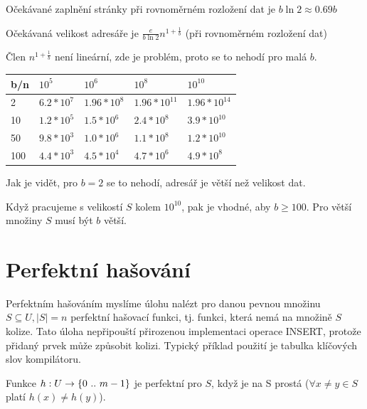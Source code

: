 Očekávané zaplnění stránky při rovnoměrném rozložení dat je 
$b \ln 2 \approx 0.69 b$

Očekávaná velikost adresáře je $\frac{e}{b \ln 2} n^{1 + \frac{1}{b}}$ (při
rovnoměrném rozložení dat)

\begin{pozn}
Člen $n^{1 + \frac{1}{b}}$ není lineární, zde je problém, proto se to
nehodí pro malá $b$.
\end{pozn}

\begin{tabular}{|l||l|l|l|l|}
\hline
b/n   	&$10^5$   &$10^6$ 	&$10^8$ 	&$10^{10}$    \\
\hline
2  	&$6.2*10^7$  &$1.96*10^8$	&$1.96*10^{11}$	&$1.96*10^{14}$ \\
10	&$1.2*10^5$  &$1.5*10^6$	&$2.4*10^8$	&$3.9*10^{10}$  \\
50	&$9.8*10^3$  &$1.0*10^6$	&$1.1*10^8$	&$1.2*10^{10}$  \\
100	&$4.4*10^3$  &$4.5*10^4$	&$4.7*10^6$	&$4.9*10^8$   \\
\hline
\end{tabular}

\vspace{5mm}

Jak je vidět, pro $b = 2$ se to nehodí, adresář je větší než velikost dat.

\begin{pozn}
Když pracujeme s velikostí $S$ kolem $10^{10}$, pak je vhodné, aby 
$b \geq 100$. Pro větší množiny $S$ musí být $b$ větší.
\end{pozn}

\section{Perfektní hašování}

Perfektním hašováním myslíme úlohu nalézt pro danou pevnou množinu 
$S \subseteq U, |S| = n$ perfektní hašovací funkci, tj. funkci, která nemá na 
množině $S$ kolize. Tato úloha nepřipouští přirozenou implementaci 
operace INSERT, protože přidaný prvek může způsobit kolizi. 
Typický příklad použití je tabulka klíčových slov kompilátoru.

\begin{defn}
Funkce $h: U \to \{{0}\ ..\ {m-1}\}$ je perfektní pro $S$, když je na S
prostá ($\forall x\neq y \in S$ platí $h(x) \neq h(y)$).
\end{defn}

